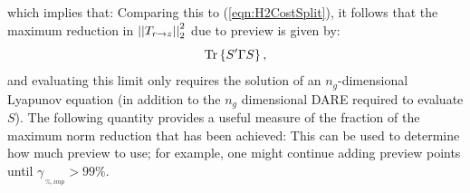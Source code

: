 which implies that:
Comparing this to (\ref{eqn:H2CostSplit}), it follows that the maximum reduction in $\left|\left| T_{r\rightarrow z} \right|\right|_2^2$ due to preview is given by: 
\[
\textrm{Tr}\left\{ S'\Gamma S \right\},
\]
and evaluating this limit only requires the solution of an $n_g$-dimensional Lyapunov equation (in addition to the $n_g$ dimensional DARE required to evaluate $S$). The following quantity provides a useful measure of the fraction of the maximum norm reduction that has been achieved:
This can be used to determine how much preview to use; for example, one might continue adding preview points until $\gamma_{\,_{\%,imp}} >99\%$.
